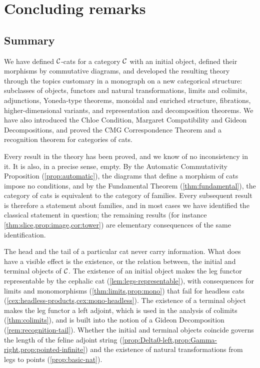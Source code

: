 \chapter{Concluding remarks}\label{ch:conclusion}

\section{Summary}

We have defined $\mathcal{C}$-cats for a category $\mathcal{C}$ with an initial object,
defined their morphisms by commutative diagrams, and developed the resulting
theory through the topics customary in a monograph on a new categorical
structure: subclasses of objects, functors and natural transformations,
limits and colimits, adjunctions, Yoneda-type theorems, monoidal and enriched
structure, fibrations, higher-dimensional variants, and representation and
decomposition theorems. We have also introduced the Chloe Condition, Margaret
Compatibility and Gideon Decompositions, and proved the CMG Correspondence
Theorem and a recognition theorem for categories of cats.

Every result in the theory has been proved, and we know of no inconsistency
in it. It is also, in a precise sense, empty. By the Automatic Commutativity
Proposition (\cref{prop:automatic}), the diagrams that define a morphism of cats
impose no conditions, and by the Fundamental Theorem (\cref{thm:fundamental}),
the category of cats is equivalent to the category of families. Every
subsequent result is therefore a statement about families, and in most cases
we have identified the classical statement in question; the remaining results
(for instance \cref{thm:slice,prop:image,cor:tower}) are elementary consequences
of the same identification.

The head and the tail of a particular cat never carry information. What does
have a visible effect is the existence, or the relation between, the initial
and terminal objects of $\mathcal{C}$. The existence of an initial object makes the leg
functor representable by the cephalic cat (\cref{lem:legs-representable}), with
consequences for limits and monomorphisms (\cref{thm:limits,prop:mono}) that
fail for headless cats (\cref{cex:headless-products,cex:mono-headless}). The
existence of a terminal object makes the leg functor a left adjoint, which is
used in the analysis of colimits (\cref{thm:colimits}), and is built into the
notion of a Gideon Decomposition (\cref{rem:recognition-tail}). Whether the
initial and terminal objects coincide governs the length of the feline adjoint
string (\cref{prop:Delta0-left,prop:Gamma-right,prop:pointed-infinite}) and the
existence of natural transformations from legs to points
(\cref{prop:basic-nat}).

